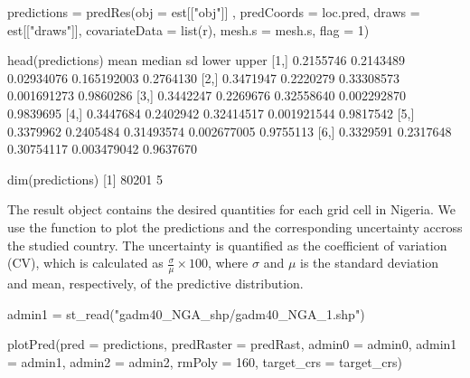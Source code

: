 \begin{example}
predictions = predRes(obj = est[["obj"]] , predCoords = loc.pred,
                      draws = est[["draws"]],
                      covariateData = list(r),
                      mesh.s = mesh.s, flag = 1)

head(predictions)
          mean    median         sd       lower     upper
[1,] 0.2155746 0.2143489 0.02934076 0.165192003 0.2764130
[2,] 0.3471947 0.2220279 0.33308573 0.001691273 0.9860286
[3,] 0.3442247 0.2269676 0.32558640 0.002292870 0.9839695
[4,] 0.3447684 0.2402942 0.32414517 0.001921544 0.9817542
[5,] 0.3379962 0.2405484 0.31493574 0.002677005 0.9755113
[6,] 0.3329591 0.2317648 0.30754117 0.003479042 0.9637670

dim(predictions)
[1] 80201     5
\end{example}
 
The result object contains the desired quantities for each grid cell in Nigeria. We use the function  to plot the predictions and the corresponding uncertainty accross the studied country. The uncertainty is quantified as the coefficient of variation (CV), which is calculated as $\frac{\sigma}{\mu} \times 100$, where $\sigma$ and $\mu$ is the standard deviation and mean, respectively, of the predictive distribution.

\begin{example}
admin1 = st_read("gadm40_NGA_shp/gadm40_NGA_1.shp")
                 
plotPred(pred = predictions, 
         predRaster = predRast, 
         admin0 = admin0,
         admin1 = admin1, 
         admin2 = admin2, 
         rmPoly = 160,
         target_crs = target_crs)
\end{example}

